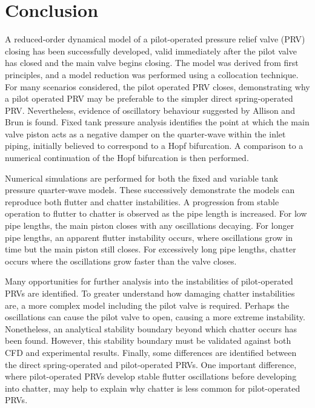 \chapter{Conclusion}

A reduced-order dynamical model of a pilot-operated pressure relief valve (PRV) closing has been successfully developed, valid immediately after the pilot valve has closed and the main valve begins closing. The model was derived from first principles, and a model reduction was performed using a collocation technique. For many scenarios considered, the pilot operated PRV closes, demonstrating why a pilot operated PRV may be preferable to the simpler direct spring-operated PRV. Nevertheless, evidence of oscillatory behaviour suggested by Allison and Brun \cite{Allison2015TestingValves} is found. Fixed tank pressure analysis identifies the point at which the main valve piston acts as a negative damper on the quarter-wave within the inlet piping, initially believed to correspond to a Hopf bifurcation. A comparison to a numerical continuation of the Hopf bifurcation is then performed.

Numerical simulations are performed for both the fixed and variable tank pressure quarter-wave models. These successively demonstrate the models can reproduce both flutter and chatter instabilities. A progression from stable operation to flutter to chatter is observed as the pipe length is increased. For low pipe lengths, the main piston closes with any oscillations decaying. For longer pipe lengths, an apparent flutter instability occurs, where oscillations grow in time but the main piston still closes. For excessively long pipe lengths, chatter occurs where the oscillations grow faster than the valve closes.

Many opportunities for further analysis into the instabilities of pilot-operated PRVs are identified. To greater understand how damaging chatter instabilities are, a more complex model including the pilot valve is required. Perhaps the oscillations can cause the pilot valve to open, causing a more extreme instability. Nonetheless, an analytical stability boundary beyond which chatter occurs has been found. However, this stability boundary must be validated against both CFD and experimental results. Finally, some differences are identified between the direct spring-operated and pilot-operated PRVs. One important difference, where pilot-operated PRVs develop stable flutter oscillations before developing into chatter, may help to explain why chatter is less common for pilot-operated PRVs.